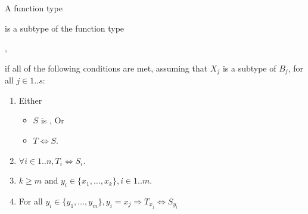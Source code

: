 \documentclass[makeidx]{article}
\begin{document}
{\LMHash{}%
A function type



\noindent
is a subtype of the function type


,

\noindent
if all of the following conditions are met,
assuming that $X_j$ is a subtype of $B_j$, for all $j \in 1 .. s$:
\begin{enumerate}
\item Either
\begin{itemize}
\item $S$ is \VOID{}, Or
\item $T \Longleftrightarrow S$.
\end{itemize}
\item $\forall i \in 1 .. n, T_i \Longleftrightarrow S_i$.
\item $k \ge m$ and $y_i \in \{x_1, \ldots, x_k\}, i \in 1 .. m$.
\item For all $y_i \in \{y_1, \ldots, y_m\}, y_i = x_j \Rightarrow T_{x_j} \Longleftrightarrow S_{y_i}$
\end{enumerate}





}
\end{document}
